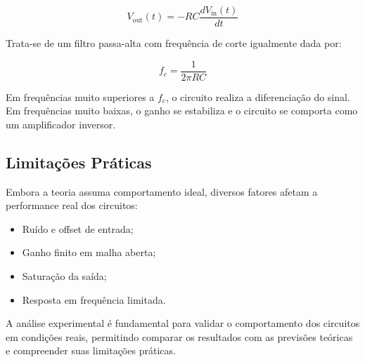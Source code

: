 \begin{equation}
    V_{\text{out}}(t) = -RC \frac{dV_{\text{in}}(t)}{dt}
\end{equation}

Trata-se de um filtro passa-alta com frequência de corte igualmente dada por:

\begin{equation}
    f_c = \frac{1}{2\pi RC}
\end{equation}

Em frequências muito superiores a $f_c$, o circuito realiza a diferenciação do sinal. Em frequências muito baixas, o ganho se estabiliza e o circuito se comporta como um amplificador inversor.

\subsection{Limitações Práticas}

Embora a teoria assuma comportamento ideal, diversos fatores afetam a performance real dos circuitos:

\begin{itemize}
    \item Ruído e offset de entrada;
    \item Ganho finito em malha aberta;
    \item Saturação da saída;
    \item Resposta em frequência limitada.
\end{itemize}

A análise experimental é fundamental para validar o comportamento dos circuitos em condições reais, permitindo comparar os resultados com as previsões teóricas e compreender suas limitações práticas.
